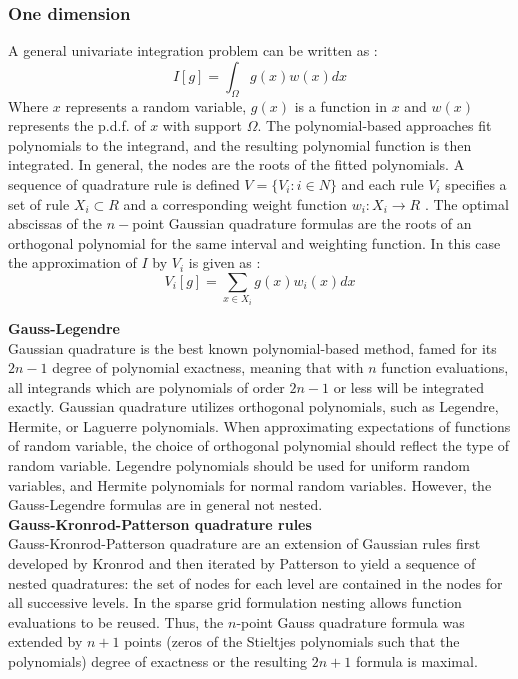 \documentclass{article}
\begin{document}
\subsubsection{One dimension}
A general univariate integration problem can be written as :
\begin{equation}
I[g] = \int_{\Omega} g(x) w(x) dx
\end{equation}
Where $x$ represents a random variable, $g(x)$ is a function in $x$ and $w(x)$ 
represents the p.d.f. of $x$ with support $\Omega$.
The polynomial-based approaches fit polynomials to the integrand, and the resulting polynomial 
function is then integrated. In general, the nodes are the roots of the fitted polynomials.
A sequence of quadrature rule is defined $V = \{V_i : i\in N\}$ and each
 rule $V_i$ specifies a set of rule $X_i \subset R$ and a corresponding weight 
 function $w_i :X_i \longrightarrow R$ . The optimal abscissas of the
 $n-$point Gaussian quadrature formulas are the roots of an orthogonal polynomial
 for the same interval and weighting function. In this case the approximation of $I$ by $V_i$ 
 is given as : 
\begin{equation}
V_i[g] =\sum_{x \in X_i}g(x) w_i(x) dx
\end{equation}

\textbf{Gauss-Legendre } \\ 
Gaussian quadrature is the best known polynomial-based method, famed for its $2n-1$ degree of 
polynomial exactness, meaning that with $n$ function evaluations, all integrands which are 
polynomials of order $2n -1$ or less will be integrated exactly. Gaussian quadrature utilizes 
orthogonal polynomials, such as Legendre, Hermite, or Laguerre polynomials. When approximating
expectations of functions of random variable, the choice of orthogonal polynomial should reflect the
type of random variable. Legendre polynomials should be used for uniform random variables, and 
Hermite polynomials for normal random variables. However, the Gauss-Legendre formulas are in
general not nested.\\

\textbf{Gauss-Kronrod-Patterson quadrature rules}\\
Gauss-Kronrod-Patterson quadrature are an extension of Gaussian rules first developed by
Kronrod and then iterated by Patterson to yield a sequence of nested quadratures: the set of
nodes for each level are contained in the nodes for all successive levels. In the sparse grid 
formulation nesting allows function evaluations to be reused. 
Thus, the $n$-point Gauss quadrature formula was extended by $n+1$ points (zeros of the Stieltjes
polynomials such that the polynomials) degree of exactness or the resulting $2n+1$ formula is maximal.\\
\end{document}
